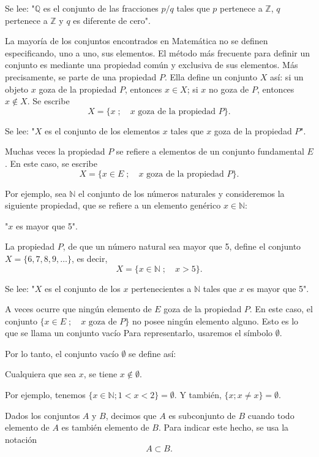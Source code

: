 \documentclass[12pt,oneside]{book}
\begin{document}
Se lee: "\( \mathbb{Q} \) es el conjunto de las fracciones \( p/q \) tales que \( p \) pertenece a \( \mathbb{Z} \), \( q \) pertenece a \( \mathbb{Z} \) y \( q \) es diferente de cero".

La mayoría de los conjuntos encontrados en Matemática no se definen especificando, uno a uno, sus elementos. El método más frecuente para definir un conjunto es mediante una propiedad común y exclusiva de sus elementos. Más precisamente, se parte de una propiedad \( P \). Ella define un conjunto \( X \) así: si un objeto \( x \) goza de la propiedad \( P \), entonces \( x \in X \); si \( x \) no goza de \( P \), entonces \( x \notin X \). Se escribe
\[X = \{x \; ; \quad x \text{ goza de la propiedad } P\}.\]

Se lee: "\( X \) es el conjunto de los elementos \( x \) tales que \( x \) goza de la propiedad \( P \)".

Muchas veces la propiedad \( P \) se refiere a elementos de un conjunto fundamental \( E \). En este caso, se escribe
\[X = \{x \in E \; ; \quad x \text{ goza de la propiedad } P\}.\]

Por ejemplo, sea \( \mathbb{N} \) el conjunto de los números naturales y consideremos la siguiente propiedad, que se refiere a un elemento genérico \( x \in \mathbb{N} \):

"\( x \) es mayor que 5".

La propiedad \( P \), de que un número natural sea mayor que 5, define el conjunto \( X = \{6, 7, 8, 9, \dots\} \), es decir,
\[X = \{x \in \mathbb{N} \; ; \quad x > 5\}.\]

Se lee: "\( X \) es el conjunto de los \( x \) pertenecientes a \( \mathbb{N} \) tales que \( x \) es mayor que 5".

A veces ocurre que ningún elemento de \( E \) goza de la propiedad \( P \). En este caso, el conjunto \( \{x \in E \; ; \quad x \text{ goza de } P\} \) no posee ningún elemento alguno. Esto es lo que se llama un conjunto vacío Para representarlo, usaremos el símbolo \(\emptyset\).

Por lo tanto, el conjunto vacío \(\emptyset\) se define así:

Cualquiera que sea \(x\), se tiene \(x \notin \emptyset\).

Por ejemplo, tenemos \(\{x \in \mathbb{N}; 1 < x < 2\} = \emptyset\). Y también, \(\{x; x \neq x\} = \emptyset\).

Dados los conjuntos \(A\) y \(B\), decimos que \(A\) es subconjunto de \(B\) cuando todo elemento de \(A\) es también elemento de \(B\). Para indicar este hecho, se usa la notación
\[A \subset B.\]
\end{document}
